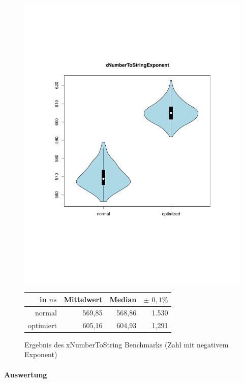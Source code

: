 \begin{figure}[H]
{		\includegraphics[trim=20mm 60mm 0mm 50mm,scale=0.50]{pictures/vioplot_xNumberToStringExponent.pdf}
	}

	\begin{table}[H]
	\centering
		\begin{tabular}{|r|r|r|r|}
			\hline
		   	in $ns$   & Mittelwert & Median & \bf{$\pm$ $0,1\%$} \\
		 	\hline
		 	\hline
		  	normal 	  & 569,85 & 568,86 & 1.530 \\
		 	optimiert & 605,16 & 604,93 & 1,291 \\ 
		  	\hline
		  	
		\end{tabular}
	\end{table}

	\caption{Ergebnis des xNumberToString Benchmarks (Zahl mit negativem Exponent)}\label{bp:xNumExp}
\end{figure}

\paragraph{Auswertung}

